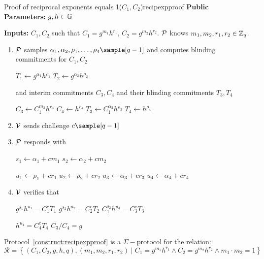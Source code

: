 \begin{construction}{Proof of reciprocal exponents equals 1($C_1, C_2$)}{recipexpproof}
    \vspace{1em}
    \textbf{Public Parameters:} $g, h \in \mathbb{G}$

    \textbf{Inputs:} $C_1, C_2$ such that $C_1 = g^{m_1}h^{r_1}$, $C_2 = g^{m_2}h^{r_2}$. $\mathcal{P}$ knows $m_1, m_2, r_1, r_2 \in \mathbb{Z}_q$.
    \vspace{1em}
        \begin{enumerate}
        \item $\mathcal{P}$ samples $\alpha_1, \alpha_2, \rho_1, \dots, \rho_4 \sample [q-1]$ and computes blinding commitments for $C_1, C_2$

        $T_1 \gets g^{\alpha_1}h^{\rho_1}$ \qquad $T_2 \gets g^{\alpha_2}h^{\rho_2}$
        
        \vspace{1em}

        and interim commitments $C_3, C_4$ and their blinding commitments $T_3, T_4$

        $C_3 \gets C_1^{m_2}h^{r_3}$ \qquad $C_4 \gets h^{r_4}$ \qquad $T_3 \gets C_1^{\alpha_2}h^{\rho_3}$ \qquad $T_4 \gets h^{\rho_4}$

        \vspace{1em}

        \item $\mathcal{V}$ sends challenge $c \sample [q-1]$

        \item $\mathcal{P}$ responds with 

        $s_1 \gets \alpha_1 + cm_1$  \qquad $s_2 \gets \alpha_2 + cm_2$

        $u_1 \gets \rho_1 + cr_1$ \qquad $u_2 \gets \rho_2 + cr_2$ \qquad  $u_3 \gets \alpha_3 + cr_3$ \qquad  $u_4 \gets \alpha_4 + cr_4$

        \item $\mathcal{V}$ verifies that 
        
        $g^{s_1}h^{u_1} = C_1^c T_1$ \qquad $g^{s_2}h^{u_2} = C_2^c T_2$ \qquad $C_1^{s_2}h^{u_3} = C_3^c T_3$
        
        $h^{u_4} = C_4^c T_4$ \qquad  $C_3/C_4 = g$
    \end{enumerate}
\end{construction}
    

\begin{theorem}
    Protocol~\ref{construct:recipexpproof} is a $\Sigma-$protocol for the relation: 
     \[
    \mathcal{R} = \left\{ (C_1, C_2, g, h, q),(m_1, m_2, r_1, r_2) \; | \; C_1 = g^{m_1}h^{r_1} \wedge C_2 = g^{m_2}h^{r_2} \wedge m_1 \cdot m_2 = 1 \right\}
    \]  
\end{theorem}

